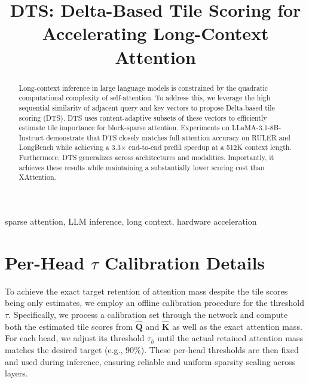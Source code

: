 \documentclass[conference]{IEEEtran}
\begin{document}
\title{DTS: Delta-Based Tile Scoring for Accelerating Long-Context Attention\\}

\author{
}

\maketitle

\begin{abstract}
Long-context inference in large language models is constrained by the quadratic computational complexity of self-attention. To address this, we leverage the high sequential similarity of adjacent query and key vectors to propose Delta-based tile scoring (DTS). DTS uses content-adaptive subsets of these vectors to efficiently estimate tile importance for block-sparse attention. Experiments on LLaMA-3.1-8B-Instruct demonstrate that DTS closely matches full attention accuracy on RULER and LongBench while achieving a 3.3× end-to-end prefill speedup at a 512K context length. Furthermore, DTS generalizes across architectures and modalities. Importantly, it achieves these results while maintaining a substantially lower scoring cost than XAttention.

\end{abstract}

\begin{IEEEkeywords}
sparse attention, LLM inference, long context, hardware acceleration
\end{IEEEkeywords}









\newpage



\appendices
\section{Per-Head $\tau$ Calibration Details}
\label{app:calibration}

To achieve the exact target retention of attention mass despite the tile scores being only estimates, we employ an offline calibration procedure for the threshold $\tau$. Specifically, we process a calibration set through the network and compute both the estimated tile scores from $\hat{\textbf{Q}}$ and $\hat{\textbf{K}}$ as well as the exact attention mass. For each head, we adjust its threshold $\tau_h$ until the actual retained attention mass matches the desired target (e.g., $90\%$). These per-head thresholds are then fixed and used during inference, ensuring reliable and uniform sparsity scaling across layers.
\end{document}
